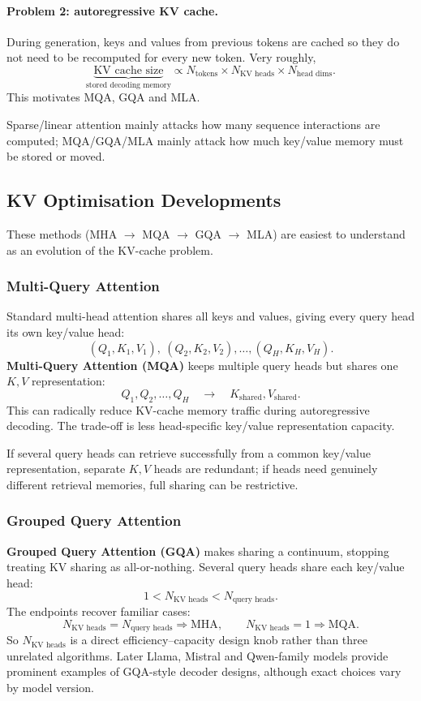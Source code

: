 \paragraph{Problem 2: autoregressive KV cache.}
During generation, keys and values from previous tokens are cached so they do not need to be recomputed for every new token.
Very roughly,
\[
\underbrace{\text{KV cache size}}_{\text{stored decoding memory}}
\propto
N_{\text{tokens}}
\times
N_{\text{KV heads}}
\times
N_{\text{head dims}}.
\]
This motivates MQA, GQA and MLA.

\begin{calloutmemoryhook}
Sparse/linear attention mainly attacks how many sequence interactions are computed; MQA/GQA/MLA mainly attack how much key/value memory must be stored or moved.
\end{calloutmemoryhook}

\subsection{KV Optimisation Developments}
\label{subsec:modern-kv-attention-evolution}
These methods (MHA $\rightarrow$ MQA $\rightarrow$ GQA $\rightarrow$ MLA) are easiest to understand as an evolution of the KV-cache problem.

\subsubsection{Multi-Query Attention}
Standard multi-head attention shares all keys and values, giving every query head its own key/value head:
\[
(Q_1,K_1,V_1),\ (Q_2,K_2,V_2),\ldots,(Q_H,K_H,V_H).
\]
\textbf{Multi-Query Attention (MQA)} keeps multiple query heads but shares one $K,V$ representation:
\[
Q_1,Q_2,\ldots,Q_H
\quad\longrightarrow\quad
K_{\text{shared}},V_{\text{shared}}.
\]
This can radically reduce KV-cache memory traffic during autoregressive decoding.
The trade-off is less head-specific key/value representation capacity.

\begin{calloutbias}
If several query heads can retrieve successfully from a common key/value representation, separate $K,V$ heads are redundant; if heads need genuinely different retrieval memories, full sharing can be restrictive.
\end{calloutbias}

\subsubsection{Grouped Query Attention}
\textbf{Grouped Query Attention (GQA)} makes sharing a continuum, stopping treating KV sharing as all-or-nothing.
Several query heads share each key/value head:
\[
1
<
N_{\text{KV heads}}
<
N_{\text{query heads}}.
\]
The endpoints recover familiar cases:
\[
N_{\text{KV heads}}=N_{\text{query heads}}
\Rightarrow
\text{MHA},
\qquad
N_{\text{KV heads}}=1
\Rightarrow
\text{MQA}.
\]
So $N_{\text{KV heads}}$ is a direct efficiency--capacity design knob rather than three unrelated algorithms.
Later Llama, Mistral and Qwen-family models provide prominent examples of GQA-style decoder designs, although exact choices vary by model version.


